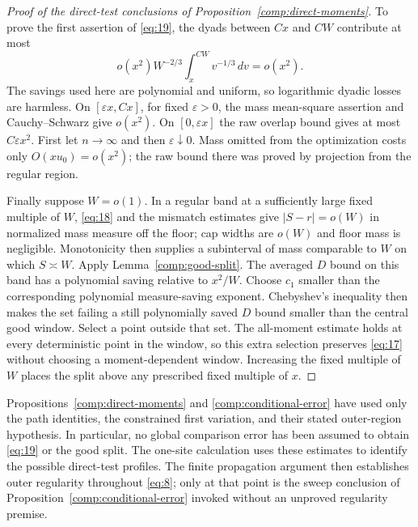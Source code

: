 \begin{proof}[Proof of the direct-test conclusions of
Proposition~\ref{comp:direct-moments}]
To prove the first assertion of \eqref{eq:19}, the dyads between
$Cx$ and $CW$ contribute at most
\[
 o(x^2)W^{-2/3}\int_x^{CW}v^{-1/3}\,dv=o(x^2).
\]
The savings used here are polynomial and uniform, so logarithmic
dyadic losses are harmless.  On $[\varepsilon x,Cx]$, for fixed
$\varepsilon>0$, the mass mean-square assertion and Cauchy--Schwarz
give $o(x^2)$.  On $[0,\varepsilon x]$ the raw overlap bound gives
at most $C\varepsilon x^2$.  First let $n\to\infty$ and then
$\varepsilon\downarrow0$.  Mass omitted from the optimization costs
only $O(xu_0)=o(x^2)$; the raw bound there was proved by projection
from the regular region.

Finally suppose $W=o(1)$.  In a regular band at a sufficiently large
fixed multiple of $W$, \eqref{eq:18} and the mismatch estimates give
$|S-r|=o(W)$ in normalized mass measure off the floor; cap widths are
$o(W)$ and floor mass is negligible.  Monotonicity then supplies a
subinterval of mass comparable to $W$ on which $S\asymp W$.
Apply Lemma~\ref{comp:good-split}.  The averaged $D$ bound on this
band has a polynomial saving relative to $x^2/W$.  Choose $c_1$
smaller than the corresponding polynomial measure-saving exponent.
Chebyshev's inequality then makes the set failing a still
polynomially saved $D$ bound smaller than the central good window.
Select a point outside that set.  The all-moment estimate holds at
every deterministic point in the window, so this extra selection
preserves \eqref{eq:17} without choosing a moment-dependent window.
Increasing the fixed multiple of $W$ places the split above any
prescribed fixed multiple of $x$.
\end{proof}

\begin{remark}\label{comp:dependency}
Propositions~\ref{comp:direct-moments} and
\ref{comp:conditional-error} have used only the path identities,
the constrained first variation, and their stated outer-region
hypothesis.  In particular, no global comparison error has been
assumed to obtain \eqref{eq:19} or the good split.  The one-site
calculation uses these estimates to identify the possible direct-test
profiles.  The finite propagation argument then establishes outer
regularity throughout \eqref{eq:8}; only at that point is the sweep
conclusion of Proposition~\ref{comp:conditional-error} invoked without
an unproved regularity premise.
\end{remark}
